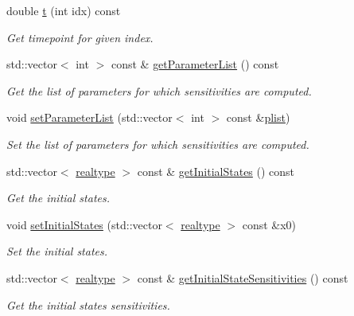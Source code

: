 \begin{DoxyCompactItemize}
double \mbox{\hyperlink{classamici_1_1_model_a711281d57e9710226face29151cc4641}{t}} (int idx) const
\begin{DoxyCompactList}\small\item\em Get timepoint for given index. \end{DoxyCompactList}\item 
std\+::vector$<$ int $>$ const  \& \mbox{\hyperlink{classamici_1_1_model_a94b6dfdb4883c916627b287e4d7b9b44}{get\+Parameter\+List}} () const
\begin{DoxyCompactList}\small\item\em Get the list of parameters for which sensitivities are computed. \end{DoxyCompactList}\item 
void \mbox{\hyperlink{classamici_1_1_model_a2afe974183e4bccaf746f6409941fe8f}{set\+Parameter\+List}} (std\+::vector$<$ int $>$ const \&\mbox{\hyperlink{classamici_1_1_model_a6ac0de1b7dfddbb4a480657f62573563}{plist}})
\begin{DoxyCompactList}\small\item\em Set the list of parameters for which sensitivities are computed. \end{DoxyCompactList}\item 
std\+::vector$<$ \mbox{\hyperlink{namespaceamici_a1bdce28051d6a53868f7ccbf5f2c14a3}{realtype}} $>$ const  \& \mbox{\hyperlink{classamici_1_1_model_a34b007de55db268995bdc788accdc57d}{get\+Initial\+States}} () const
\begin{DoxyCompactList}\small\item\em Get the initial states. \end{DoxyCompactList}\item 
void \mbox{\hyperlink{classamici_1_1_model_ada7cb3dadf4cee4b8fd6f092fee54b3c}{set\+Initial\+States}} (std\+::vector$<$ \mbox{\hyperlink{namespaceamici_a1bdce28051d6a53868f7ccbf5f2c14a3}{realtype}} $>$ const \&x0)
\begin{DoxyCompactList}\small\item\em Set the initial states. \end{DoxyCompactList}\item 
std\+::vector$<$ \mbox{\hyperlink{namespaceamici_a1bdce28051d6a53868f7ccbf5f2c14a3}{realtype}} $>$ const  \& \mbox{\hyperlink{classamici_1_1_model_a989b8202ceac7b6f94bb1503519a56fb}{get\+Initial\+State\+Sensitivities}} () const
\begin{DoxyCompactList}\small\item\em Get the initial states sensitivities. \end{DoxyCompactList}\item 

\end{DoxyCompactItemize}
